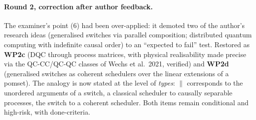 \documentclass[11pt,a4paper]{article}
\newcommand{\WP}[1]{\textbf{WP#1}}
\begin{document}
\paragraph{Round 2, correction after author feedback.} The examiner's point (6) had been over-applied: it demoted two of the author's research ideas (generalised switches via parallel composition; distributed quantum computing with indefinite causal order) to an ``expected to fail'' test. Restored as \WP{2c} (DQC through process matrices, with physical realisability made precise via the QC-CC/QC-QC classes of Wechs et al.\ 2021, verified) and \WP{2d} (generalised switches as coherent schedulers over the linear extensions of a pomset). The analogy is now stated at the level of \emph{types}: $\parallel$ corresponds to the unordered arguments of a switch, a classical scheduler to causally separable processes, the switch to a coherent scheduler. Both items remain conditional and high-risk, with done-criteria.
\fi
\end{document}
